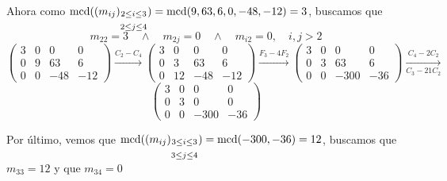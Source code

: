 \documentclass[12pt]{article}
\begin{document}
\begin{ejercicio}[2 puntos]
\begin{enumerate}[label=(\alph*)]
            Ahora como $\operatorname{mcd}((m_{ij})_{\substack{2\le i\le 3 \\\\ 2\le j\le 4}}) = \operatorname{mcd}(9,63,6,0,-48,-12) = 3$, buscamos que $$m_{22} = 3 \quad \land \quad m_{2j} = 0 \quad \land \quad m_{i2} = 0, \quad i,j>2$$
            $$\begin{pmatrix}
                3 & 0 & 0 & 0 \\
                0 & 9 & 63 & 6 \\
                0 & 0 & -48 & -12
            \end{pmatrix}
            \xrightarrow{C_2 - C_4}
            \begin{pmatrix}
                3 & 0 & 0 & 0 \\
                0 & 3 & 63 & 6 \\
                0 & 12 & -48 & -12
            \end{pmatrix} 
            \xrightarrow{F_3 - 4F_2}
            \begin{pmatrix}
                3 & 0 & 0 & 0 \\
                0 & 3 & 63 & 6 \\
                0 & 0 & -300 & -36
            \end{pmatrix}
            \underset{C_3-21C_2}{\xrightarrow{C_4-2C_2}}$$
            $$
            \begin{pmatrix}
                3 & 0 & 0 & 0 \\
                0 & 3 & 0 & 0 \\
                0 & 0 & -300 & -36
            \end{pmatrix}
            $$

            Por último, vemos que $\operatorname{mcd}((m_{ij})_{\substack{3\le i\le 3 \\\\ 3\le j\le 4}}) = \operatorname{mcd}(-300, -36) = 12$, buscamos que $m_{33} = 12$ y que $m_{34} = 0$


\end{enumerate}
\end{ejercicio}
\end{document}
